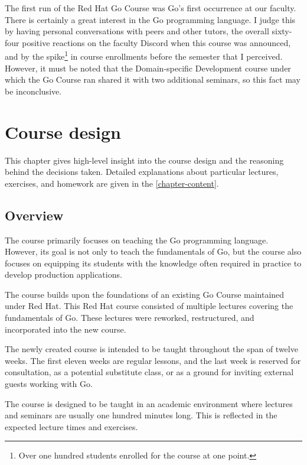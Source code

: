 \documentclass[
  digital,
  color,
  oneside,
  nosansbold,
  nocolorbold,
  lof,
  nolot,
]{fithesis4}
\begin{document}
The first run of the Red Hat Go Course was Go's first occurrence at our faculty. There is certainly a great interest in the Go programming language. I judge this by having personal conversations with peers and other tutors, the overall sixty-four positive reactions on the faculty Discord when this course was announced, and by the spike\footnote{Over one hundred students enrolled for the course at one point.}
in course enrollments before the semester that I perceived. However, it must be noted that the Domain-specific Development course under which the Go Course ran shared it with two additional seminars, so this fact may be inconclusive.

\chapter{Course design}\label{chapter-design}

This chapter gives high-level insight into the course design and the reasoning behind the decisions taken. Detailed explanations about particular lectures, exercises, and homework are given in the \cref{chapter-content}.

\section{Overview}\label{design-overview}

The course primarily focuses on teaching the Go programming language. However, its goal is not only to teach the fundamentals of Go, but the course also focuses on equipping its students with the knowledge often required in practice to develop production applications.

The course builds upon the foundations of an existing Go Course maintained under Red Hat\cite{redhat-go-course}. This Red Hat course consisted of multiple lectures covering the fundamentals of Go. These lectures were reworked, restructured, and incorporated into the new course.

The newly created course is intended to be taught throughout the span of twelve weeks. The first eleven weeks are regular lessons, and the last week is reserved for consultation, as a potential substitute class, or as a ground for inviting external guests working with Go.

The course is designed to be taught in an academic environment where lectures and seminars are usually one hundred minutes long. This is reflected in the expected lecture times and exercises.
\end{document}
